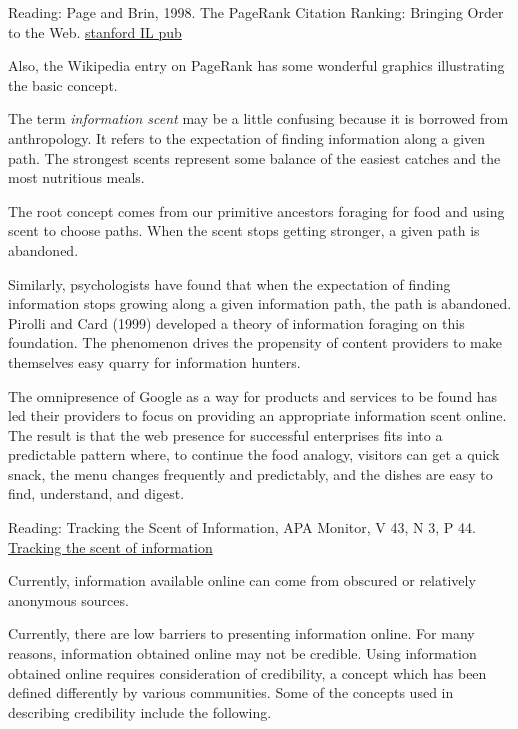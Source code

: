 Reading: Page and Brin, 1998. The PageRank Citation Ranking: Bringing
Order to the Web.
\href{http://ilpubs.stanford.edu:8090/422/1/1999-66.pdf}{stanford IL
pub}

Also, the Wikipedia entry on PageRank has some wonderful graphics
illustrating the basic concept.

\hypertarget{information-scent}{%
\label{information-scent}}

The term \emph{information scent} may be a little confusing because it
is borrowed from anthropology. It refers to the expectation of finding
information along a given path. The strongest scents represent some
balance of the easiest catches and the most nutritious meals.

The root concept comes from our primitive ancestors foraging for food
and using scent to choose paths. When the scent stops getting stronger,
a given path is abandoned.

Similarly, psychologists have found that when the expectation of finding
information stops growing along a given information path, the path is
abandoned. Pirolli and Card (1999) developed a theory of information
foraging on this foundation. The phenomenon drives the propensity of
content providers to make themselves easy quarry for information
hunters.

The omnipresence of Google as a way for products and services to be
found has led their providers to focus on providing an appropriate
information scent online. The result is that the web presence for
successful enterprises fits into a predictable pattern where, to
continue the food analogy, visitors can get a quick snack, the menu
changes frequently and predictably, and the dishes are easy to find,
understand, and digest.

Reading: Tracking the Scent of Information, APA Monitor, V 43, N 3, P
44. \href{http://www.apa.org/monitor/2012/03/information.aspx}{Tracking
the scent of information}

\hypertarget{information-credibility}{%
\label{information-credibility}}

Currently, information available online can come from obscured or
relatively anonymous sources.

Currently, there are low barriers to presenting information online. For
many reasons, information obtained online may not be credible. Using
information obtained online requires consideration of credibility, a
concept which has been defined differently by various communities. Some
of the concepts used in describing credibility include the following.


